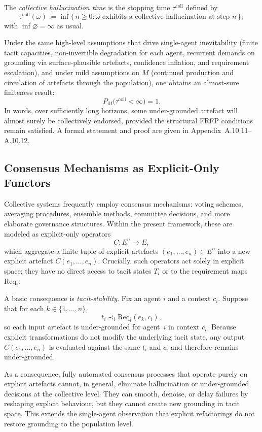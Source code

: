 The \emph{collective hallucination time} is the stopping time $\tau^{\mathrm{coll}}$ defined by
\[
  \tau^{\mathrm{coll}}(\omega)
  := \inf\{\,n \ge 0 : \omega \text{ exhibits a collective hallucination at step } n\,\},
\]
with $\inf \varnothing = \infty$ as usual.

Under the same high-level assumptions that drive single-agent inevitability (finite tacit capacities, non-invertible degradation for each agent, recurrent demands on grounding via surface-plausible artefacts, confidence inflation, and requirement escalation), and under mild assumptions on $M$ (continued production and circulation of artefacts through the population), one obtains an almost-sure finiteness result:
\[
  P_M\bigl(\tau^{\mathrm{coll}} < \infty\bigr) = 1.
\]
In words, over sufficiently long horizons, some under-grounded artefact will almost surely be collectively endorsed, provided the structural FRFP conditions remain satisfied. A formal statement and proof are given in Appendix~A.10.11--A.10.12.

\subsection{Consensus Mechanisms as Explicit-Only Functors}

Collective systems frequently employ consensus mechanisms: voting schemes, averaging procedures, ensemble methods, committee decisions, and more elaborate governance structures. Within the present framework, these are modeled as explicit-only operators
\[
  C : E^n \longrightarrow E,
\]
which aggregate a finite tuple of explicit artefacts $(e_1,\dots,e_n) \in E^n$ into a new explicit artefact $C(e_1,\dots,e_n)$. Crucially, such operators act solely in explicit space; they have no direct access to tacit states $T_i$ or to the requirement maps $\mathrm{Req}_i$.

A basic consequence is \emph{tacit-stability}. Fix an agent $i$ and a context $c_i$. Suppose that for each $k \in \{1,\dots,n\}$,
\[
  t_i \prec_i \mathrm{Req}_i(e_k,c_i),
\]
so each input artefact is under-grounded for agent~$i$ in context $c_i$. Because explicit transformations do not modify the underlying tacit state, any output $C(e_1,\dots,e_n)$ is evaluated against the same $t_i$ and $c_i$ and therefore remains under-grounded.

As a consequence, fully automated consensus processes that operate purely on explicit artefacts cannot, in general, eliminate hallucination or under-grounded decisions at the collective level. They can smooth, denoise, or delay failures by reshaping explicit behaviour, but they cannot create new grounding in tacit space. This extends the single-agent observation that explicit refactorings do not restore grounding to the population level.

